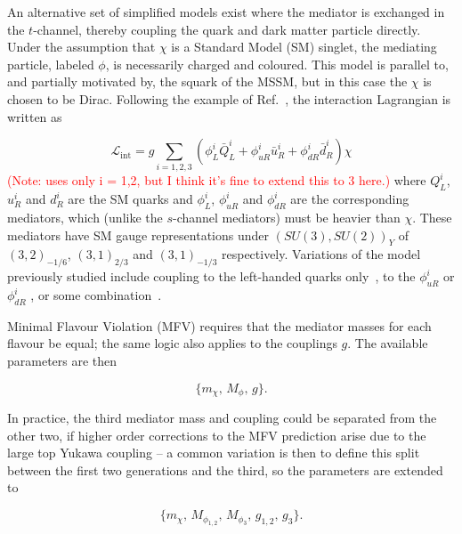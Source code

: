 

An alternative set of simplified models exist where the mediator is exchanged in the $t$-channel, thereby coupling the quark and dark matter particle directly. Under the assumption that $\chi$ is a Standard Model (SM) singlet, the mediating particle, labeled $\phi$, is necessarily charged and coloured. This model is parallel to, and partially motivated by, the squark of the MSSM, but in this case the $\chi$ is chosen to be Dirac. Following the example of Ref.~\cite{Papucci:2014}, the interaction Lagrangian is written as

\begin{equation}
\mathcal{L}_{\mathrm{int}} = g \sum_{i=1,2,3} (\phi_L^i \bar{Q}_L^i + \phi_{uR}^i \bar{u}_R^i + \phi_{dR}^i \bar{d}_R^i) \chi
\end{equation}
\textcolor{red}{(Note: \cite{Papucci:2014} uses only i = 1,2, but I think it's fine to extend this to 3 here.)}
where $Q_L^i$, $u_R^i$ and $d_R^i$ are the SM quarks and $\phi_L^i$, $\phi_{uR}^i$ and $\phi_{dR}^i$ are the corresponding mediators, which (unlike the $s$-channel mediators) must be heavier than $\chi$. These mediators have SM gauge representations under $(SU(3), SU(2))_Y$ of $(3,2)_{-1/6}$, $(3,1)_{2/3}$ and $(3,1)_{-1/3}$ respectively. Variations of the model previously studied include coupling to the left-handed quarks only~\cite{Chang:2014, Busoni:201409022}, to the $\phi_{uR}^i$ \cite{Tait} or $\phi_{dR}^i$ \cite{Papucci:2014, Yavin:14092893}, or some combination~\cite{Bai:201311171, An:201489115014}.

\vspace{5mm}

Minimal Flavour Violation (MFV) requires that the mediator masses for each flavour be equal; the same logic also applies to the couplings $g$. The available parameters are then

\begin{equation}
\{ m_{\chi},\, M_{\phi},\, g\}.
\end{equation}

In practice, the third mediator mass and coupling could be separated from the other two, if higher order corrections to the MFV prediction arise due to the large top Yukawa coupling -- a common variation is then to define this split between the first two generations and the third, so the parameters are extended to

\begin{equation}
\{ m_{\chi},\, M_{\phi_{1,2}},\,M_{\phi_3},\, g_{1,2},\, g_3\}.
\end{equation}

